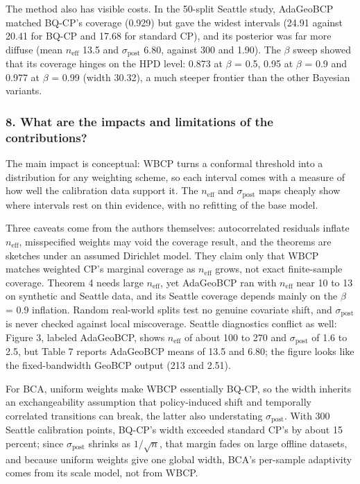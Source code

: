 \documentclass[11pt]{article}
\newcommand{\question}[1]{\subsubsection*{#1}}
\begin{document}
The method also has visible costs. In the 50-split Seattle study, AdaGeoBCP matched BQ-CP's coverage (0.929) but gave the widest intervals (24.91 against 20.41 for BQ-CP and 17.68 for standard CP), and its posterior was far more diffuse (mean $n_{\mathrm{eff}}$ 13.5 and $\sigma_{\mathrm{post}}$ 6.80, against 300 and 1.90). The \ensuremath{\beta} sweep showed that its coverage hinges on the HPD level: 0.873 at \ensuremath{\beta} = 0.5, 0.95 at \ensuremath{\beta} = 0.9 and 0.977 at \ensuremath{\beta} = 0.99 (width 30.32), a much steeper frontier than the other Bayesian variants.

\question{8. What are the impacts and limitations of the contributions?}

The main impact is conceptual: WBCP turns a conformal threshold into a distribution for any weighting scheme, so each interval comes with a measure of how well the calibration data support it. The $n_{\mathrm{eff}}$ and $\sigma_{\mathrm{post}}$ maps cheaply show where intervals rest on thin evidence, with no refitting of the base model.

Three caveats come from the authors themselves: autocorrelated residuals inflate $n_{\mathrm{eff}}$, misspecified weights may void the coverage result, and the theorems are sketches under an assumed Dirichlet model. They claim only that WBCP matches weighted CP's marginal coverage as $n_{\mathrm{eff}}$ grows, not exact finite-sample coverage. Theorem 4 needs large $n_{\mathrm{eff}}$, yet AdaGeoBCP ran with $n_{\mathrm{eff}}$ near 10 to 13 on synthetic and Seattle data, and its Seattle coverage depends mainly on the \ensuremath{\beta} = 0.9 inflation. Random real-world splits test no genuine covariate shift, and $\sigma_{\mathrm{post}}$ is never checked against local miscoverage. Seattle diagnostics conflict as well: Figure 3, labeled AdaGeoBCP, shows $n_{\mathrm{eff}}$ of about 100 to 270 and $\sigma_{\mathrm{post}}$ of 1.6 to 2.5, but Table 7 reports AdaGeoBCP means of 13.5 and 6.80; the figure looks like the fixed-bandwidth GeoBCP output (213 and 2.51).

For BCA, uniform weights make WBCP essentially BQ-CP, so the width inherits an exchangeability assumption that policy-induced shift and temporally correlated transitions can break, the latter also understating $\sigma_{\mathrm{post}}$. With 300 Seattle calibration points, BQ-CP's width exceeded standard CP's by about 15 percent; since $\sigma_{\mathrm{post}}$ shrinks as $1/\sqrt{n}$, that margin fades on large offline datasets, and because uniform weights give one global width, BCA's per-sample adaptivity comes from its scale model, not from WBCP.
\end{document}
